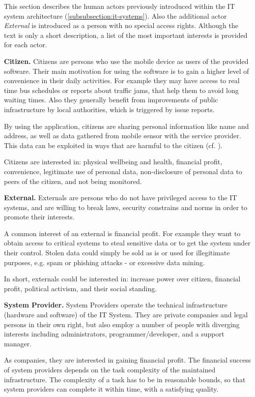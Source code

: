 \documentclass[runningheads,a4paper]{llncs}
\begin{document}
This section describes the human actors previously introduced within the IT system architecture (\ref{subsubsection:it-systems}).
Also the additional actor \textit{External} is introduced as a person with no special access rights. Although the text is only a short description, a list of the most important interests is provided for each actor.

\textbf{Citizen.}
Citizens are persons who use the mobile device as users of the provided software.
Their main motivation for using the software is to gain a higher level of convenience in their daily activities. For example they may have access to real time bus schedules or reports about traffic jams, that help them to avoid long waiting times. Also they generally benefit from improvements of public infrastructure by local authorities, which is triggered by issue reports.

By using the application, citizens are sharing personal information like name and address, as well as data gathered from mobile sensor with the service provider. This data can be exploited in ways that are harmful to the citizen (cf. \cite{GuardienMassSurveillance}).

Citizens are interested in: physical wellbeing and health, financial profit, convenience, legitimate use of personal data, non-disclosure of personal data to peers of the citizen, and not being monitored.

\textbf{External.}
Externals are persons who do not have privileged access to the IT systems, and are willing to break laws, security constrains and norms in order to promote their interests. 

A common interest of an external is financial profit. For example they want to obtain access to critical systems to steal sensitive data or to get the system under their control. Stolen data could simply be sold as is or used for illegitimate purposes, e.g. spam or phishing attacks - or excessive data mining.

In short, externals could be interested in: increase power over citizen, financial profit, political activism, and their social standing.

\textbf{System Provider.}
System Providers operate the technical infrastructure (hardware and software) of the IT System.
They are private companies and legal persons in their own right, but also employ a number of people with diverging interests including administrators, programmer/developer, and a support manager.

As companies, they are interested in gaining financial profit. The financial success of system providers depends on the task complexity of the maintained infrastructure. The complexity of a task has to be in reasonable bounds, so that system providers can complete it within time, with a satisfying quality.
\end{document}
